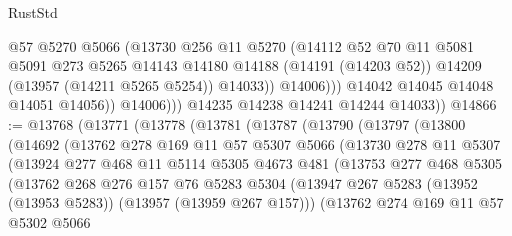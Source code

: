 \begin{lexlean}{RustStd}
\begin{coremodule}
                        @57
                        @5270
                        @5066
                        (@13730
                          @256
                          @11
                          @5270
                          (@14112
                            @52
                            @70
                            @11
                            @5081
                            @5091
                            @273
                            @5265
                            @14143
                            @14180
                            @14188
                            (@14191 (@14203 @52))
                            @14209
                            (@13957 (@14211 @5265 @5254))
                            @14033))
                        @14006)))
                  @14042
                  @14045
                  @14048
                  @14051
                  @14056))
              @14006)))
        @14235
        @14238
        @14241
        @14244
        @14033))
@14866 := @13768
    (@13771
      (@13778
        (@13781
          (@13787
            (@13790
              (@13797
                (@13800
                  (@14692
                    (@13762
                      @278
                      @169
                      @11
                      @57
                      @5307
                      @5066
                      (@13730
                        @278
                        @11
                        @5307
                        (@13924
                          @277
                          @468
                          @11
                          @5114
                          @5305
                          @4673
                          @481
                          (@13753
                            @277
                            @468
                            @5305
                            (@13762
                              @268
                              @276
                              @157
                              @76
                              @5283
                              @5304
                              (@13947
                                @267
                                @5283
                                (@13952 (@13953 @5283))
                                (@13957 (@13959 @267 @157)))
                              (@13762
                                @274
                                @169
                                @11
                                @57
                                @5302
                                @5066

\end{coremodule}
\end{lexlean}
